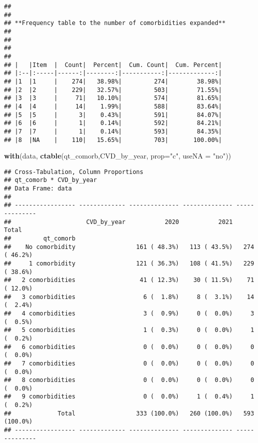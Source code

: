 \documentclass[
]{article}
\newenvironment{Shaded}{\begin{snugshade}}{\end{snugshade}}
\newcommand{\AttributeTok}[1]{\textcolor[rgb]{0.13,0.29,0.53}{#1}}
\newcommand{\FunctionTok}[1]{\textcolor[rgb]{0.13,0.29,0.53}{\textbf{#1}}}
\newcommand{\NormalTok}[1]{#1}
\newcommand{\StringTok}[1]{\textcolor[rgb]{0.31,0.60,0.02}{#1}}
\begin{document}
\begin{verbatim}
## 
## 
## **Frequency table to the number of comorbidities expanded**   
## 
## 
## 
## 
## |   |Item  |  Count|  Percent|  Cum. Count|  Cum. Percent|
## |:--|:-----|------:|--------:|-----------:|-------------:|
## |1  |1     |    274|   38.98%|         274|        38.98%|
## |2  |2     |    229|   32.57%|         503|        71.55%|
## |3  |3     |     71|   10.10%|         574|        81.65%|
## |4  |4     |     14|    1.99%|         588|        83.64%|
## |5  |5     |      3|    0.43%|         591|        84.07%|
## |6  |6     |      1|    0.14%|         592|        84.21%|
## |7  |7     |      1|    0.14%|         593|        84.35%|
## |8  |NA    |    110|   15.65%|         703|       100.00%|
\end{verbatim}

\begin{Shaded}
\begin{Highlighting}[]
\FunctionTok{with}\NormalTok{(data, }\FunctionTok{ctable}\NormalTok{(qt\_comorb,CVD\_by\_year, }\AttributeTok{prop=}\StringTok{"c"}\NormalTok{, }\AttributeTok{useNA =} \StringTok{"no"}\NormalTok{))}
\end{Highlighting}
\end{Shaded}

\begin{verbatim}
## Cross-Tabulation, Column Proportions  
## qt_comorb * CVD_by_year  
## Data Frame: data  
## 
## ----------------- ------------- -------------- -------------- --------------
##                     CVD_by_year           2020           2021          Total
##         qt_comorb                                                           
##    No comorbidity                 161 ( 48.3%)   113 ( 43.5%)   274 ( 46.2%)
##     1 comorbidity                 121 ( 36.3%)   108 ( 41.5%)   229 ( 38.6%)
##   2 comorbidities                  41 ( 12.3%)    30 ( 11.5%)    71 ( 12.0%)
##   3 comorbidities                   6 (  1.8%)     8 (  3.1%)    14 (  2.4%)
##   4 comorbidities                   3 (  0.9%)     0 (  0.0%)     3 (  0.5%)
##   5 comorbidities                   1 (  0.3%)     0 (  0.0%)     1 (  0.2%)
##   6 comorbidities                   0 (  0.0%)     0 (  0.0%)     0 (  0.0%)
##   7 comorbidities                   0 (  0.0%)     0 (  0.0%)     0 (  0.0%)
##   8 comorbidities                   0 (  0.0%)     0 (  0.0%)     0 (  0.0%)
##   9 comorbidities                   0 (  0.0%)     1 (  0.4%)     1 (  0.2%)
##             Total                 333 (100.0%)   260 (100.0%)   593 (100.0%)
## ----------------- ------------- -------------- -------------- --------------
\end{verbatim}
\end{document}
